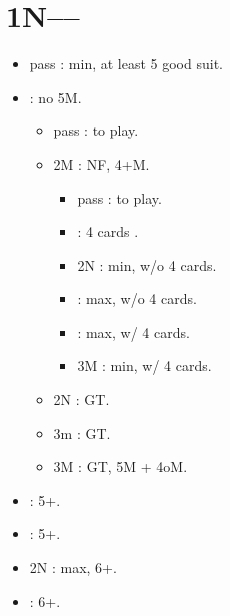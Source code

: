\documentclass[12pt,twoside,a5paper]{report}%
\begin{document}
	\section*{1N----}
		\begin{itemize}
		\renewcommand{\labelitemi}{}
		\item pass : min, at least 5\cl{} good suit.
		\item {} : no 5M.
			\begin{itemize}
			\renewcommand{\labelitemi}{--}
				\item pass : to play.
				\item 2M : NF, 4+M.
					\begin{itemize}
					\renewcommand{\labelitemi}{}
						\item pass : to play.
						\item {} : 4 cards \sp{}.
						\item 2N : min, w/o 4 cards.
						\item {} : max, w/o 4 cards.
						\item {} : max, w/ 4 cards.
						\item 3M : min, w/ 4 cards.
					\end{itemize}
				\item 2N : GT.
				\item 3m : GT.
				\item 3M : GT, 5M + 4oM.
			\end{itemize}
		\item {} : 5+\he{}.
		\item {} : 5+\sp{}.
		\item 2N : max, 6+\di{}.
		\item {} : 6+\cl{}.
		\end{itemize}
\end{document}
